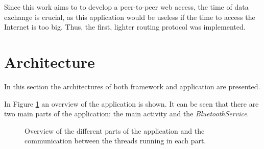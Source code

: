Since this work aims to to develop a peer-to-peer web access, the time of data exchange is crucial, as this application would be useless if the time to access the Internet is too big. Thus, the first, lighter routing protocol was implemented.

\section{Architecture}
\label{sec:architecture}

In this section the architectures of both framework and application are presented.

In Figure \ref{fig:appsandbox} an overview of the application is shown. It can be seen that there are two main parts of the application: the main activity and the \textit{BluetoothService}.

\begin{figure}[ht]
	\noindent{}
	\caption{\label{fig:appsandbox} Overview of the different parts of the application and the communication between the threads running in each part.}
\end{figure}

